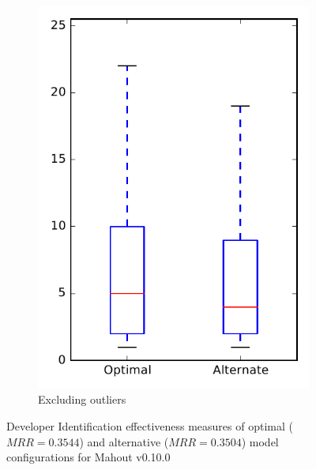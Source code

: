 \begin{figure}
\begin{subfigure}{.4\textwidth}
        \includegraphics[height=0.4\textheight]{figures/combo/dit_rq1_mahout_no_outlier}
        \caption{Excluding outliers}\label{fig:combo:dit:rq1:mahout_no_outlier}
    \end{subfigure}
\caption{Developer Identification effectiveness measures of optimal ($MRR=0.3544$) and alternative ($MRR=0.3504$) model configurations for Mahout v0.10.0}
\label{fig:combo:dit:rq1:mahout}
\end{figure}
